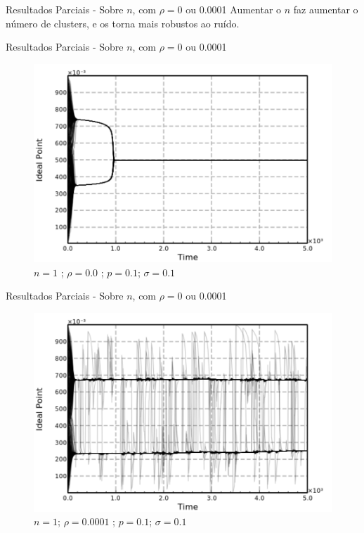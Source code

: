 \documentclass{beamer}
\begin{document}
\begin{frame}{Resultados Parciais - Sobre \(n\), com \(\rho = 0 \) ou 0.0001}
  Aumentar o \(n\) faz aumentar o número de clusters, e os torna mais robustos
  ao ruído.
\end{frame}

\begin{frame}{Resultados Parciais - Sobre \(n\), com \(\rho = 0 \) ou 0.0001}
  \begin{figure}[H]
    \centering
    \includegraphics[scale = 0.5]{ims/p(01)sigma(01)rho(00).pdf}
    \caption{\(n = 1\) ; \(\rho = 0.0\)  ; \(p = 0.1\); \(\sigma = 0.1\) }
  \end{figure}
\end{frame}





\begin{frame}{Resultados Parciais - Sobre \(n\), com \(\rho = 0 \) ou 0.0001}
  \begin{figure}[H]
    \centering
    \includegraphics[scale = 0.5]{ims/p(01)sigma(01)rho(00001).pdf}
    \caption{ \(n = 1 \); \(\rho = 0.0001\)  ; \(p = 0.1\); \(\sigma = 0.1\) }
  \end{figure}
\end{frame}
\end{document}
